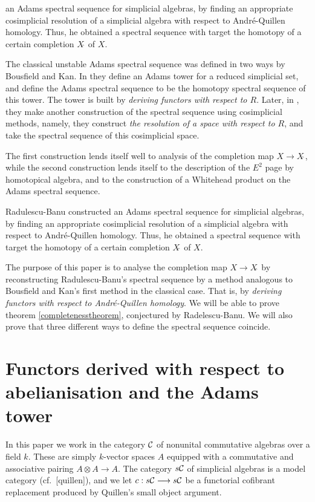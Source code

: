 \documentclass[11pt]{amsart}
\theoremstyle{plain}
\begin{document}
\begin{shaded}
\tiny
an Adams spectral sequence for simplicial algebras, by finding an appropriate cosimplicial resolution of a simplicial algebra with respect to Andr\'e-Quillen homology. Thus, he obtained a spectral sequence with target the homotopy of a certain completion $X{\hat\,}$ of $X$.
\begin{itemise}
\setlength{\parindent}{.25in}
\item The classical unstable Adams spectral sequence was defined in two ways by Bousfield and Kan. In \cite{BousKanSSeq.pdf} they define an Adams tower for a reduced simplicial set, and define the Adams spectral sequence to be the homotopy spectral sequence of this tower. The tower is built by \emph{deriving functors with respect to $R$}.
 Later, in \cite{BK_pairings_products.pdf}, they make another construction of the spectral sequence using cosimplicial methods, namely, they construct \emph{the resolution of a space with respect to $R$}, and take the spectral sequence of this cosimplicial space.
\item The first construction lends itself well to analysis of the completion map $X\to X{\hat\,}$, while the second construction lends itself to the description of the $E^2$ page by homotopical algebra, and to the construction of a Whitehead product on the Adams spectral sequence.
\item Radulescu-Banu \cite{radelescuBanu.pdf} constructed an Adams spectral sequence for simplicial algebras, by finding an appropriate cosimplicial resolution of a simplicial algebra with respect to Andr\'e-Quillen homology. Thus, he obtained a spectral sequence with target the homotopy of a certain completion $X{\hat\,}$ of $X$.

The purpose of this paper is to analyse the completion map $X\to X{\hat\,}$ by reconstructing Radulescu-Banu's spectral sequence by a method analogous to Bousfield and Kan's first method in the classical case. That is, by \emph{deriving functors with respect to Andr\'e-Quillen homology}. We will be able to prove theorem \ref{completenesstheorem}, conjectured by Radelescu-Banu. We will also prove that three different ways to define the spectral sequence coincide.
\end{itemise}

\end{shaded}


\section{Functors derived with respect to abelianisation and the Adams tower}\label{sec:derWRTab}
In this paper we work in the category $\mathcal{C}$ of nonunital commutative algebras over a field $k$. These are simply $k$-vector spaces $A$ equipped with a commutative and associative pairing $A\otimes A\to A$. The category $s\mathcal{C}$ of simplicial algebras is a model category (cf.\ [quillen]), and we let $c:s\mathcal{C}\longrightarrow s\mathcal{C}$ be a functorial cofibrant replacement produced by Quillen's small object argument.
\end{document}
